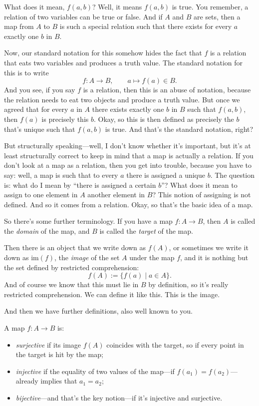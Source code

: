 What does it mean, $f(a, b)$? Well, it means $f(a, b)$ is true. You remember, a relation of two variables can be true or false. And if $A$ and $B$ are sets, then a map from $A$ to $B$ is such a special relation such that there exists for every $a$ exactly one $b$ in $B$.

Now, our standard notation for this somehow hides the fact that $f$ is a relation that eats two variables and produces a truth value. The standard notation for this is to write
\[
f : A \to B, \qquad a \mapsto f(a) \in B.
\]
And you see, if you say $f$ is a relation, then this is an abuse of notation, because the relation needs to eat two objects and produce a truth value. But once we agreed that for every $a$ in $A$ there exists exactly one $b$ in $B$ such that $f(a, b)$, then $f(a)$ is precisely this $b$. Okay, so this is then defined as precisely the $b$ that's unique such that $f(a, b)$ is true. And that's the standard notation, right?

But structurally speaking---well, I don't know whether it's important, but it's at least structurally correct to keep in mind that a map is actually a relation. If you don't look at a map as a relation, then you get into trouble, because you have to say: well, a map is such that to every $a$ there is assigned a unique $b$. The question is: what do I mean by ``there is assigned a certain $b$''? What does it mean to assign to one element in $A$ another element in $B$? This notion of assigning is not defined. And so it comes from a relation. Okay, so that's the basic idea of a map.

So there's some further terminology. If you have a map $f : A \to B$, then $A$ is called the \emph{domain} of the map, and $B$ is called the \emph{target} of the map.

Then there is an object that we write down as $f(A)$, or sometimes we write it down as $\mathrm{im}(f)$, the \emph{image} of the set $A$ under the map $f$, and it is nothing but the set defined by restricted comprehension:
\[
f(A) := \{ f(a) \mid a \in A \}.
\]
And of course we know that this must lie in $B$ by definition, so it's really restricted comprehension. We can define it like this. This is the image.

And then we have further definitions, also well known to you.

A map $f : A \to B$ is:
\begin{itemize}
\item \emph{surjective} if its image $f(A)$ coincides with the target, so if every point in the target is hit by the map;
\item \emph{injective} if the equality of two values of the map---if $f(a_1) = f(a_2)$---already implies that $a_1 = a_2$;
\item \emph{bijective}---and that's the key notion---if it's injective and surjective.
\end{itemize}

